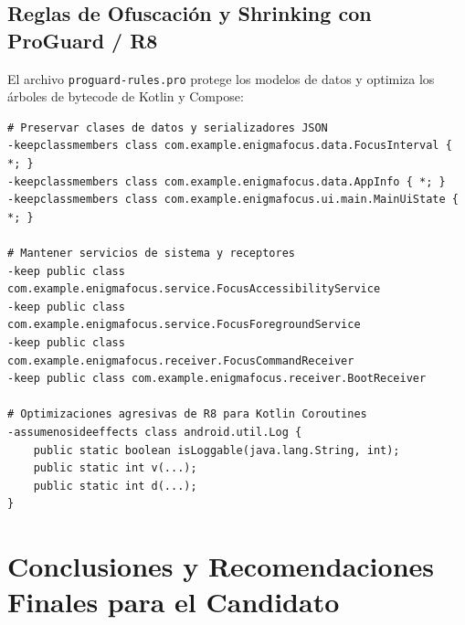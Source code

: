 \documentclass[11pt,a4paper,oneside]{report}
\begin{document}
\section{Reglas de Ofuscación y Shrinking con ProGuard / R8}
El archivo \texttt{proguard-rules.pro} protege los modelos de datos y optimiza los árboles de bytecode de Kotlin y Compose:

\begin{lstlisting}[caption={Reglas de ofuscacion de ProGuard/R8 para Enigma Focus.}]
# Preservar clases de datos y serializadores JSON
-keepclassmembers class com.example.enigmafocus.data.FocusInterval { *; }
-keepclassmembers class com.example.enigmafocus.data.AppInfo { *; }
-keepclassmembers class com.example.enigmafocus.ui.main.MainUiState { *; }

# Mantener servicios de sistema y receptores
-keep public class com.example.enigmafocus.service.FocusAccessibilityService
-keep public class com.example.enigmafocus.service.FocusForegroundService
-keep public class com.example.enigmafocus.receiver.FocusCommandReceiver
-keep public class com.example.enigmafocus.receiver.BootReceiver

# Optimizaciones agresivas de R8 para Kotlin Coroutines
-assumenosideeffects class android.util.Log {
    public static boolean isLoggable(java.lang.String, int);
    public static int v(...);
    public static int d(...);
}
\end{lstlisting}

\newpage

\chapter[Conclusiones y Estrategia]{Conclusiones y Recomendaciones Finales para el Candidato}
\end{document}
